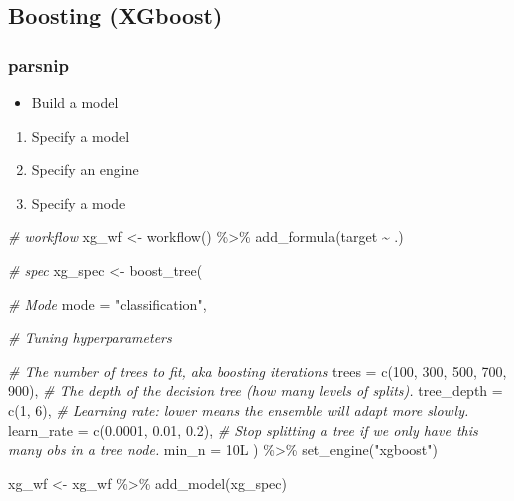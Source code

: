 \documentclass[
]{book}
\newenvironment{Shaded}{\begin{snugshade}}{\end{snugshade}}
\newcommand{\AttributeTok}[1]{\textcolor[rgb]{0.77,0.63,0.00}{#1}}
\newcommand{\CommentTok}[1]{\textcolor[rgb]{0.56,0.35,0.01}{\textit{#1}}}
\newcommand{\DecValTok}[1]{\textcolor[rgb]{0.00,0.00,0.81}{#1}}
\newcommand{\FloatTok}[1]{\textcolor[rgb]{0.00,0.00,0.81}{#1}}
\newcommand{\FunctionTok}[1]{\textcolor[rgb]{0.00,0.00,0.00}{#1}}
\newcommand{\NormalTok}[1]{#1}
\newcommand{\OtherTok}[1]{\textcolor[rgb]{0.56,0.35,0.01}{#1}}
\newcommand{\SpecialCharTok}[1]{\textcolor[rgb]{0.00,0.00,0.00}{#1}}
\newcommand{\StringTok}[1]{\textcolor[rgb]{0.31,0.60,0.02}{#1}}
\providecommand{\tightlist}{%
  \setlength{\itemsep}{0pt}\setlength{\parskip}{0pt}}
\begin{document}
\hypertarget{boosting-xgboost}{%
\subsection{Boosting (XGboost)}\label{boosting-xgboost}}

\hypertarget{parsnip-3}{%
\subsubsection{parsnip}\label{parsnip-3}}

\begin{itemize}
\tightlist
\item
  Build a model
\end{itemize}

\begin{enumerate}
\def\labelenumi{\arabic{enumi}.}
\tightlist
\item
  Specify a model
\item
  Specify an engine
\item
  Specify a mode
\end{enumerate}

\begin{Shaded}
\begin{Highlighting}[]
\CommentTok{\# workflow}
\NormalTok{xg\_wf }\OtherTok{\textless{}{-}} \FunctionTok{workflow}\NormalTok{() }\SpecialCharTok{\%\textgreater{}\%} \FunctionTok{add\_formula}\NormalTok{(target }\SpecialCharTok{\textasciitilde{}}\NormalTok{ .)}

\CommentTok{\# spec}
\NormalTok{xg\_spec }\OtherTok{\textless{}{-}} \FunctionTok{boost\_tree}\NormalTok{(}

  \CommentTok{\# Mode}
  \AttributeTok{mode =} \StringTok{"classification"}\NormalTok{,}

  \CommentTok{\# Tuning hyperparameters}

  \CommentTok{\# The number of trees to fit, aka boosting iterations}
  \AttributeTok{trees =} \FunctionTok{c}\NormalTok{(}\DecValTok{100}\NormalTok{, }\DecValTok{300}\NormalTok{, }\DecValTok{500}\NormalTok{, }\DecValTok{700}\NormalTok{, }\DecValTok{900}\NormalTok{),}
  \CommentTok{\# The depth of the decision tree (how many levels of splits).}
  \AttributeTok{tree\_depth =} \FunctionTok{c}\NormalTok{(}\DecValTok{1}\NormalTok{, }\DecValTok{6}\NormalTok{),}
  \CommentTok{\# Learning rate: lower means the ensemble will adapt more slowly.}
  \AttributeTok{learn\_rate =} \FunctionTok{c}\NormalTok{(}\FloatTok{0.0001}\NormalTok{, }\FloatTok{0.01}\NormalTok{, }\FloatTok{0.2}\NormalTok{),}
  \CommentTok{\# Stop splitting a tree if we only have this many obs in a tree node.}
  \AttributeTok{min\_n =}\NormalTok{ 10L}
\NormalTok{) }\SpecialCharTok{\%\textgreater{}\%}
  \FunctionTok{set\_engine}\NormalTok{(}\StringTok{"xgboost"}\NormalTok{)}

\NormalTok{xg\_wf }\OtherTok{\textless{}{-}}\NormalTok{ xg\_wf }\SpecialCharTok{\%\textgreater{}\%} \FunctionTok{add\_model}\NormalTok{(xg\_spec)}
\end{Highlighting}
\end{Shaded}
\end{document}
